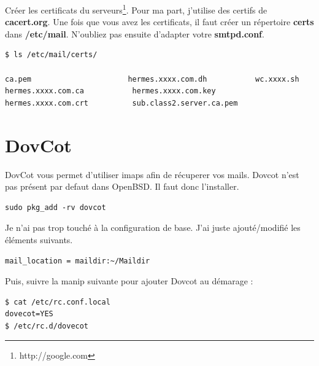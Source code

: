 \documentclass[a4paper,11pt]{article}
\begin{document}
\vspace{5mm}
Créer les certificats du serveurs\footnote{http://google.com}. Pour ma part, j'utilise des certifs de
{\bf cacert.org}. Une fois que vous avez les certificats, il faut créer un répertoire
{\bf certs} dans {\bf /etc/mail}. N'oubliez pas ensuite d'adapter votre {\bf smtpd.conf}. 

\vspace{5mm}
\begin{lstlisting}[language=bash,caption={Préparation d'OpenSMTPd},frame=bt,breaklines=true]
$ ls /etc/mail/certs/

ca.pem                      hermes.xxxx.com.dh           wc.xxxx.sh
hermes.xxxx.com.ca           hermes.xxxx.com.key
hermes.xxxx.com.crt          sub.class2.server.ca.pem 
\end{lstlisting}

\vspace{5mm}
\section*{DovCot}

DovCot vous permet d'utiliser imaps afin de récuperer vos mails. Dovcot n'est pas présent par defaut dans OpenBSD. Il faut 
donc l'installer.

\vspace{5mm}
\begin{lstlisting}[caption={/etc/pf.conf},frame=bt,breaklines=true]
sudo pkg_add -rv dovcot
\end{lstlisting}

\vspace{5mm}
Je n'ai pas trop touché à la configuration de base. J'ai juste ajouté/modifié les éléments suivants.

\vspace{5mm}
\begin{lstlisting}[caption={/etc/dovecot/conf.d/10-mail.conf},frame=bt,breaklines=true]
mail_location = maildir:~/Maildir
\end{lstlisting}

\vspace{5mm}
Puis, suivre la manip suivante pour ajouter Dovcot au démarage :

\vspace{5mm}
\begin{lstlisting}[caption={Dovcot au boot},frame=bt,breaklines=true]
$ cat /etc/rc.conf.local                                                                                                                                                   
dovecot=YES
$ /etc/rc.d/dovecot
\end{lstlisting}
\end{document}
